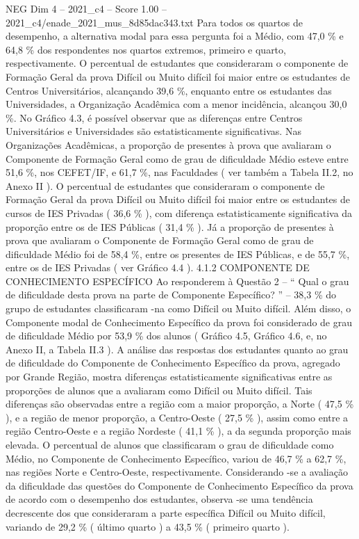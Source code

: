 \begin{textsample}{NEG Dim 4 – 2021\_c4 – Score 1.00 – 2021\_c4/enade\_2021\_mus\_8d85dac343.txt}
Para todos os quartos de desempenho, a alternativa modal para essa pergunta foi a Médio, com 47,0 \% e 64,8 \% dos respondentes nos quartos extremos, primeiro e quarto, respectivamente.
O percentual de estudantes que consideraram o componente de Formação Geral da prova Difícil ou Muito difícil foi maior entre os estudantes de Centros Universitários, alcançando 39,6 \%, enquanto entre os estudantes das Universidades, a Organização Acadêmica com a menor incidência, alcançou 30,0 \%.
No Gráfico 4.3, é possível observar que as diferenças entre Centros Universitários e Universidades são estatisticamente significativas.
Nas Organizações Acadêmicas, a proporção de presentes à prova que avaliaram o Componente de Formação Geral como de grau de dificuldade Médio esteve entre 51,6 \%, nos CEFET/IF, e 61,7 \%, nas Faculdades ( ver também a Tabela II.2, no Anexo II ).
O percentual de estudantes que consideraram o componente de Formação Geral da prova Difícil ou Muito difícil foi maior entre os estudantes de cursos de IES Privadas ( 36,6 \% ), com diferença estatisticamente significativa da proporção entre os de IES Públicas ( 31,4 \% ).
Já a proporção de presentes à prova que avaliaram o Componente de Formação Geral como de grau de dificuldade Médio foi de 58,4 \%, entre os presentes de IES Públicas, e de 55,7 \%, entre os de IES Privadas ( ver Gráfico 4.4 ). 4.1.2 COMPONENTE DE CONHECIMENTO ESPECÍFICO Ao responderem à Questão 2 – “ Qual o grau de dificuldade desta prova na parte de Componente Específico? ” – 38,3 \% do grupo de estudantes classificaram -na como Difícil ou Muito difícil.
Além disso, o Componente modal de Conhecimento Específico da prova foi considerado de grau de dificuldade Médio por 53,9 \% dos alunos ( Gráfico 4.5, Gráfico 4.6, e, no Anexo II, a Tabela II.3 ).
A análise das respostas dos estudantes quanto ao grau de dificuldade do Componente de Conhecimento Específico da prova, agregado por Grande Região, mostra diferenças estatisticamente significativas entre as proporções de alunos que a avaliaram como Difícil ou Muito difícil.
Tais diferenças são observadas entre a região com a maior proporção, a Norte ( 47,5 \% ), e a região de menor proporção, a Centro-Oeste ( 27,5 \% ), assim como entre a região Centro-Oeste e a região Nordeste ( 41,1 \% ), a da segunda proporção mais elevada.
O percentual de alunos que classificaram o grau de dificuldade como Médio, no Componente de Conhecimento Específico, variou de 46,7 \% a 62,7 \%, nas regiões Norte e Centro-Oeste, respectivamente.
Considerando -se a avaliação da dificuldade das questões do Componente de Conhecimento Específico da prova de acordo com o desempenho dos estudantes, observa -se uma tendência decrescente dos que consideraram a parte específica Difícil ou Muito difícil, variando de 29,2 \% ( último quarto ) a 43,5 \% ( primeiro quarto ).

\end{textsample}
